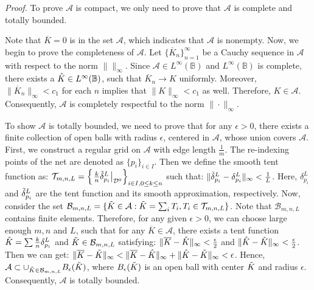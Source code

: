 \documentclass{article}
\begin{document}
\textit{Proof.}
To prove $\mathcal{A}$ is compact, we only need to prove that $\mathcal{A}$ is complete and totally bounded.

Note that $\overline{K} = 0$ is in the set $\mathcal{A}$, which indicates that $\mathcal{A}$ is nonempty. Now, we begin to prove the completeness of $\mathcal{A}$. Let $\{\overline{K}_n \}^{\infty}_{n=1}$ be a Cauchy sequence in $\mathcal{A}$ with respect to the norm $\| \|_{\infty}$. Since $\mathcal{A}\in L^{\infty}(\mathbb B)$ and $L^{\infty}(\mathbb B)$ is complete, there exists a $\Hat{K} \in L^{\infty}(\mathbb B)$, such that $\overline{K}_n \rightarrow K$ uniformly. Moreover, $\| \overline{K}_n \|_{\infty} < c_1 $ for each $n$ implies that $\| K \|_{\infty} < c_1 $ as well. Therefore, $ K \in \mathcal{A}$. Consequently, $\mathcal{A}$ is completely respectful to the norm $\| \cdot \|_{\infty}$.

To show $\mathcal{A}$ is totally bounded, we need to prove that for any $\epsilon>0$, there exists a finite collection of open balls with radius $\epsilon$, centered in $\mathcal{A}$, whose union covers $\mathcal{A}$. First, we construct a regular grid on $\mathcal{A}$ with edge length $\frac{1}{m}$. The re-indexing points of the net are denoted as $\{p_i \}_{i\in I}$. Then we define the smooth tent function as: $\mathcal{T}_{m,n,L} = \left\{ \left.\frac{k}{n}\Tilde{\delta}^{L}_{p_i} \right|_{\mathcal{D}^0}  \right\}_{i \in I,0 \leq k \leq n}$ such that: $\|\Tilde{\delta}^{L}_{p_i} - \delta^{L}_{p_i} \|_{\infty} <\frac{1}{L}$. Here, $\delta^{L}_{p_i}$ and $\Tilde{\delta}^{L}_{p_i}$ are the tent function and its smooth approximation, respectively. Now, consider the set $\mathcal{B}_{m,n,L} = \{\Tilde{K} \in \mathcal{A}: \Tilde{K} = \sum_i T_i, T_i \in \mathcal{T}_{m,n,L} \}$. Note that $\mathcal{B}_{m,n,L}$ contains finite elements. Therefore, for any given $\epsilon >0$, we can choose large enough $m,n$ and $L$, such that for any $\overline{K} \in \mathcal{A}$, there exists a tent function $\Hat{K} = \sum \frac{k}{n}\delta^{L}_{p_i}$ and $\Tilde{K} \in \mathcal{B}_{m,n,L}$ satisfying: $\| \overline{K} - \Hat{K} \|_{\infty} < \frac{\epsilon}{2}$ and $\| \Hat{K} - \Tilde{K} \|_{\infty} < \frac{\epsilon}{2}$. Then we can get: $\| \overline{K} - \Tilde{K} \|_{\infty} < \| \overline{K} - \Hat{K} \|_{\infty}  + \| \Hat{K} - \Tilde{K} \|_{\infty} < \epsilon$. Hence, $\mathcal{A} \subset \cup_{\Tilde{K} \in \mathcal{B}_{m,n,L}} B_{\epsilon}(\Tilde{K})$, where $B_{\epsilon}(\Tilde{K})$ is an open ball with center $\Tilde{K}$ and radius $\epsilon$. Consequently, $\mathcal{A}$ is totally bounded.
\end{document}
